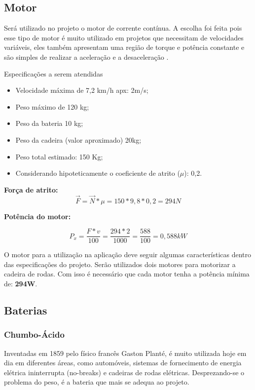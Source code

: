 \subsection{Motor}
Será utilizado no projeto o motor de corrente contínua. A escolha foi feita pois esse tipo de motor é muito utilizado em projetos que necessitam de velocidades variáveis, eles também apresentam uma região de torque e potência constante e são simples de realizar a aceleração e a desaceleração \cite{manual_bateria_unipower}.

Especificações a serem atendidas
\begin{itemize}
 \item Velocidade máxima de 7,2 km/h apx: 2m/s;
 \item Peso máximo de 120 kg;
 \item Peso da bateria 10 kg;
 \item Peso da cadeira (valor aproximado) 20kg;
 \item Peso total estimado: 150 Kg;
 \item Considerando hipoteticamente o coeficiente de atrito ($\mu$): 0,2.
\end{itemize}

\textbf{Força de atrito:}
\begin{equation}
 \overrightarrow{F} = \overrightarrow{N} * \mu = 150 * 9,8 * 0,2 = 294N
\end{equation}

\textbf{Potência do motor:}

\begin{equation}
 P_{x} = \frac{F * v}{100} = \frac{294 * 2}{1000} = \frac{588}{100} = 0,588kW
\end{equation}

O motor para a utilização na aplicação deve seguir algumas características dentro das especificações do projeto. Serão utilizados dois motores para motorizar a cadeira de rodas. Com isso é necessário que cada motor tenha a potência mínima de: \textbf{294W}.

\subsection{Baterias}
\subsubsection{Chumbo-Ácido}
Inventadas em 1859 pelo físico francês Gaston Planté, é muito utilizada hoje em dia em diferentes áreas, como automóveis, sistemas de fornecimento de energia elétrica ininterrupta (no-breaks) e cadeiras de rodas elétricas. Desprezando-se o problema do peso, é a bateria que mais se adequa ao projeto.

